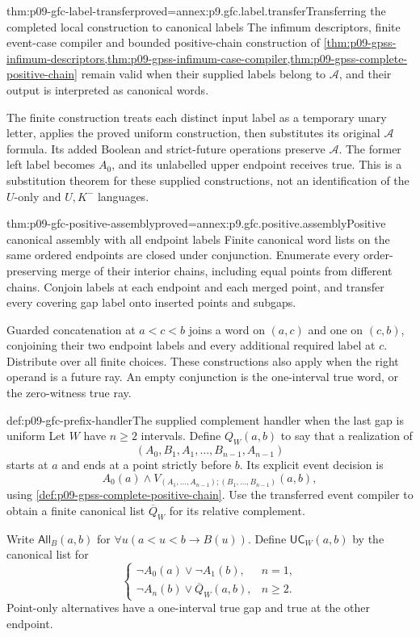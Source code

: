 \begin{hblemma}{thm:p09-gfc-label-transfer}{proved=annex:p9.gfc.label.transfer}{Transferring the completed local construction to canonical labels}
The infimum descriptors, finite event-case compiler and bounded
positive-chain construction of
\cref{thm:p09-gpss-infimum-descriptors,thm:p09-gpss-infimum-case-compiler,thm:p09-gpss-complete-positive-chain}
remain valid when their supplied labels belong to \(\mathcal A\),
and their output is interpreted as canonical words.

The finite construction treats each distinct input label as a
temporary unary letter, applies the proved uniform construction,
then substitutes its original \(\mathcal A\) formula. Its added
Boolean and strict-future operations preserve \(\mathcal A\).
The former left label becomes \(A_0\), and its unlabelled upper
endpoint receives true. This is a substitution theorem for
these supplied constructions, not an identification of the
\(U\)-only and \(U,K^-\) languages.
\end{hblemma}

\begin{hblemma}{thm:p09-gfc-positive-assembly}{proved=annex:p9.gfc.positive.assembly}{Positive canonical assembly with all endpoint labels}
Finite canonical word lists on the same ordered endpoints
are closed under conjunction. Enumerate every order-preserving
merge of their interior chains, including equal points from
different chains. Conjoin labels at each endpoint and each
merged point, and transfer every covering gap label onto
inserted points and subgaps.

Guarded concatenation at \(a<c<b\) joins a word on \((a,c)\)
and one on \((c,b)\), conjoining their two endpoint labels
and every additional required label at \(c\). Distribute over
all finite choices. These constructions also apply when the
right operand is a future ray. An empty conjunction is the
one-interval true word, or the zero-witness true ray.
\end{hblemma}

\begin{hbdefinition}{def:p09-gfc-prefix-handler}{The supplied complement handler when the last gap is uniform}
Let \(W\) have \(n\geq2\) intervals. Define \(Q_W(a,b)\)
to say that a realization of
\[
                 (A_0,B_1,A_1,\ldots,B_{n-1},A_{n-1})
\]
starts at \(a\) and ends at a point strictly before \(b\).
Its explicit event decision is
\[
 A_0(a)\land
 V_{(A_1,\ldots,A_{n-1});(B_1,\ldots,B_{n-1})}(a,b),
\]
using \cref{def:p09-gpss-complete-positive-chain}.
Use the transferred event compiler to obtain a finite canonical
list \(\overline Q_W\) for its relative complement.

Write \(\mathsf{All}_B(a,b)\) for
\(\forall u(a<u<b\to B(u))\).
Define \(\mathsf{UC}_W(a,b)\) by the canonical list for
\[
 \begin{cases}
   \neg A_0(a)\lor\neg A_1(b),&n=1,\\
   \neg A_n(b)\lor\overline Q_W(a,b),&n\geq2.
 \end{cases}
\]
Point-only alternatives have a one-interval true gap and
true at the other endpoint.
\end{hbdefinition}

